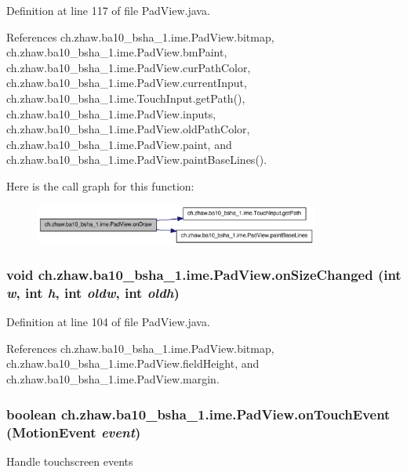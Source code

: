 Definition at line 117 of file PadView.java.

References ch.zhaw.ba10\_\-bsha\_\-1.ime.PadView.bitmap, ch.zhaw.ba10\_\-bsha\_\-1.ime.PadView.bmPaint, ch.zhaw.ba10\_\-bsha\_\-1.ime.PadView.curPathColor, ch.zhaw.ba10\_\-bsha\_\-1.ime.PadView.currentInput, ch.zhaw.ba10\_\-bsha\_\-1.ime.TouchInput.getPath(), ch.zhaw.ba10\_\-bsha\_\-1.ime.PadView.inputs, ch.zhaw.ba10\_\-bsha\_\-1.ime.PadView.oldPathColor, ch.zhaw.ba10\_\-bsha\_\-1.ime.PadView.paint, and ch.zhaw.ba10\_\-bsha\_\-1.ime.PadView.paintBaseLines().

Here is the call graph for this function:\nopagebreak
\begin{figure}[H]
\begin{center}
\leavevmode
\includegraphics[width=265pt]{classch_1_1zhaw_1_1ba10__bsha__1_1_1ime_1_1PadView_ac3129d73ee224efd3cd031971c810818_cgraph}
\end{center}
\end{figure}
\hypertarget{classch_1_1zhaw_1_1ba10__bsha__1_1_1ime_1_1PadView_acb791dfd686e052f61ff46a40de66b58}{
\subsubsection[{onSizeChanged}]{\setlength{\rightskip}{0pt plus 5cm}void ch.zhaw.ba10\_\-bsha\_\-1.ime.PadView.onSizeChanged (int {\em w}, \/  int {\em h}, \/  int {\em oldw}, \/  int {\em oldh})}}
\label{classch_1_1zhaw_1_1ba10__bsha__1_1_1ime_1_1PadView_acb791dfd686e052f61ff46a40de66b58}


Definition at line 104 of file PadView.java.

References ch.zhaw.ba10\_\-bsha\_\-1.ime.PadView.bitmap, ch.zhaw.ba10\_\-bsha\_\-1.ime.PadView.fieldHeight, and ch.zhaw.ba10\_\-bsha\_\-1.ime.PadView.margin.\hypertarget{classch_1_1zhaw_1_1ba10__bsha__1_1_1ime_1_1PadView_ac9247d50f73d59730a5893447aa8ca46}{
\subsubsection[{onTouchEvent}]{\setlength{\rightskip}{0pt plus 5cm}boolean ch.zhaw.ba10\_\-bsha\_\-1.ime.PadView.onTouchEvent (MotionEvent {\em event})}}
\label{classch_1_1zhaw_1_1ba10__bsha__1_1_1ime_1_1PadView_ac9247d50f73d59730a5893447aa8ca46}
Handle touchscreen events 

